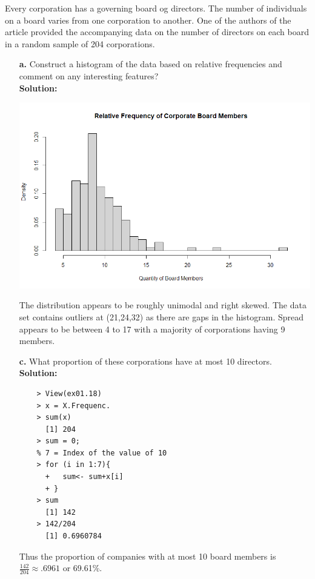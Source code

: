 \documentclass[12pt]{article}
\makeatletter
\theoremstyle{homework}
\newenvironment{exercise}[1]
{\def\@currentlabel{#1}\exercisecore}
{\endexercisecore}
\makeatother
\begin{document}
\begin{exercise}{1.18} Every corporation has a governing board og directors. The number of individuals on a board varies from one corporation to another. One of the authors of the article provided the accompanying data on the number of directors on each board in a random sample of 204 corporations.\\
  \begin{enumerate}
    \item[\textbf{a.}] Construct a histogram of the data based on relative frequencies and comment on any interesting features?\\
    
    \textbf{Solution:}
    \begin{center}
\includegraphics[width=\textwidth]{hist.png}      
    \end{center}
    The distribution appears to be roughly unimodal and right skewed. The data set contains outliers at (21,24,32) as there are gaps in the histogram. Spread appears to be between 4 to 17 with a majority of corporations having 9 members. 

    \vspace{.5in}
     
    \item[\textbf{c.}] What proportion of these corporations have at most 10 directors.\\
    
    \textbf{Solution:}

    \begin{lstlisting}
    > View(ex01.18)
    > x = X.Frequenc.
    > sum(x)
      [1] 204
    > sum = 0;
    % 7 = Index of the value of 10
    > for (i in 1:7){
      +   sum<- sum+x[i]
      + }
    > sum
      [1] 142
    > 142/204
      [1] 0.6960784
    \end{lstlisting}
    Thus the proportion of companies with at most 10 board members is $\frac{142}{204} \approx .6961$ or 69.61\%. 
    
    \vspace{.5in}
     
  \end{enumerate}


\end{exercise}
\vspace{1in}
\end{document}
